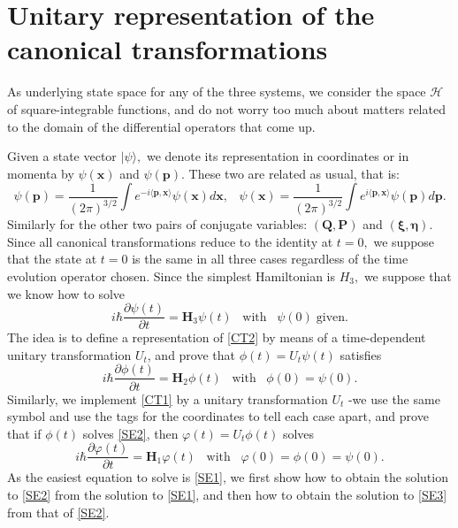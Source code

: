 \documentclass[12pt]{article}
\numberwithin{equation}{section}
\newcommand{\bxi}{{\boldsymbol \xi}}
\newcommand{\bet}{{\boldsymbol \eta}}
\def\bp{{\boldsymbol p}}
\def\bP{{\boldsymbol P}}
\def\bQ{{\boldsymbol Q}}
\def\bx{{\boldsymbol x}}
\def\bH{{\boldsymbol H}}
\def\cH{{\mathcal H}}
\begin{document}
\section{Unitary representation of the canonical transformations}
As underlying state space for any of the three systems, we consider the space $\cH$ of square-integrable functions, and do not worry too much about matters related to the domain of the differential operators that come up. 

Given a state vector $|\psi\rangle,$ we denote its representation in coordinates or in momenta by $\psi(\bx)$ and $\psi(\bp).$ These two are related as usual, that is:
\begin{equation}\label{FT}
\psi(\bp) = \frac{1}{(2\pi)^{3/2}}\int e^{-i\langle\bp,\bx\rangle}\psi(\bx)d\bx,\;\;\;\psi(\bx) = \frac{1}{(2\pi)^{3/2}}\int e^{i\langle\bp,\bx\rangle}\psi(\bp)d\bp.
\end{equation}
Similarly for the other two pairs of conjugate variables: $(\bQ,\bP)$ and $(\bxi,\bet).$\\
Since all canonical transformations reduce to the identity at $t=0,$ we suppose that the state at $t=0$ is the same in all three cases regardless of the time evolution operator chosen. Since the simplest Hamiltonian is $H_3,$ we suppose that we know how to solve
\begin{equation}\label{SE1}
i\hbar\frac{\partial\psi(t) }{\partial t} = \bH_3\psi(t) \;\;\;\mbox{with}\;\;\; \psi(0) \;\mbox{given}.
\end{equation}
The idea is to define a representation of \eqref{CT2} by means of a time-dependent unitary transformation $U_t$, and prove that $\phi(t)=U_t\psi(t)$ satisfies
\begin{equation}\label{SE2}
i\hbar\frac{\partial\phi(t) }{\partial t} = \bH_2\phi(t) \;\;\;\mbox{with}\;\;\; \phi(0)=\psi(0).
\end{equation}
Similarly, we implement \eqref{CT1} by a unitary transformation $U_t$ -we use the same symbol and use the tags for the coordinates to tell each case apart, and prove that if $\phi(t)$ solves \eqref{SE2}, then $\varphi(t)=U_t\phi(t)$ solves
\begin{equation}\label{SE3}
i\hbar\frac{\partial\varphi(t) }{\partial t} = \bH_1\varphi(t) \;\;\;\mbox{with}\;\;\; \varphi(0)=\phi(0)=\psi(0).
\end{equation}
As the easiest equation to solve is \eqref{SE1}, we first show how to obtain the solution to \eqref{SE2} from the solution to \eqref{SE1}, and then how to obtain the solution to \eqref{SE3} from that of \eqref{SE2}.
\end{document}
